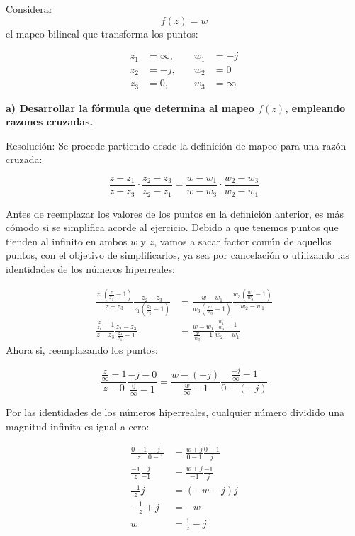 \documentclass[12pt]{report}
\begin{document}
Considerar $$ f(z) = w $$ el mapeo bilineal que transforma los puntos:

\begin{align*}
    z_1 &= \infty, \quad & w_1 &= -j \\
    z_2 &= -j, \quad & w_2 &= 0 \\
    z_3 &= 0, \quad & w_3 &= \infty 
\end{align*}

\textbf{a) Desarrollar la fórmula que determina al mapeo \( f(z) \), empleando razones cruzadas.}

Resolución: Se procede partiendo desde la definición de mapeo para una razón cruzada:

$$ \frac{z - z_1}{z - z_3} \cdot \frac{z_2 - z_3}{z_2 - z_1} = \frac{w - w_1}{w - w_3} \cdot \frac{w_2 - w_3}{w_2 - w_1} $$

Antes de reemplazar los valores de los puntos en la definición anterior, es más cómodo si se simplifica acorde al ejercicio. Debido a que tenemos puntos que tienden al infinito en ambos \( w \) y \( z \), vamos a sacar factor común de aquellos puntos, con el objetivo de simplificarlos, ya sea por cancelación o utilizando las identidades de los números hiperreales:

\begin{align*}
    \frac{z_1 \left(\frac{z}{z_1}-1\right) }{z-z_3} \frac{z_2-z_3}{z_1 \left( \frac{z_3}{z_2} -1 \right) } &= \frac{w-w_1}{w_3 \left( \frac{w}{w_3} - 1 \right)} \frac{w_3 \left( \frac{w_1}{w_3} -1 \right) }{w_2-w_1}\\[10pt]
    \frac{\frac{z}{z_1} -1}{z-z_3} \frac{z_2-z_3}{\frac{z_3}{z_1}-1} &= \frac{w-w_1}{\frac{w}{w_3}-1} \frac{\frac{w_1}{w_3}-1}{w_2-w_1}
\end{align*}
Ahora si, reemplazando los puntos:

$$\frac{\frac{z}{\infty}-1}{z-0} \frac{-j-0}{\frac{0}{\infty}-1} = \frac{w-(-j)}{\frac{w}{\infty}-1} \frac{\frac{-j}{\infty}-1}{0-(-j)}$$

Por las identidades de los números hiperreales, cualquier número dividido una magnitud infinita es igual a cero:

\begin{align*}
    \frac{0-1}{z} \frac{-j}{0-1} &= \frac{w+j}{0-1} \frac{0-1}{j}\\
    \frac{-1}{z} \frac{-j}{-1} &= \frac{w+j}{-1} \frac{-1}{j}\\
    \frac{-1}{z}j &= (-w-j)j\\
    -\frac{1}{z}+j &= -w\\
    w &= \frac{1}{z}-j
\end{align*}
\end{document}
